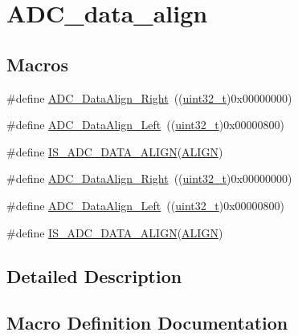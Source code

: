 \hypertarget{group___a_d_c__data__align}{}\section{A\+D\+C\+\_\+data\+\_\+align}
\label{group___a_d_c__data__align}
\subsection*{Macros}
\begin{DoxyCompactItemize}
\item 
\#define \hyperlink{group___a_d_c__data__align_ga80b5d2f2b6b058bc498f58e0a92ad035}{A\+D\+C\+\_\+\+Data\+Align\+\_\+\+Right}~((\hyperlink{_p_e___types_8h_a33594304e786b158f3fb30289278f5af}{uint32\+\_\+t})0x00000000)
\item 
\#define \hyperlink{group___a_d_c__data__align_ga87c2b7021bc288174d5d6175dc267251}{A\+D\+C\+\_\+\+Data\+Align\+\_\+\+Left}~((\hyperlink{_p_e___types_8h_a33594304e786b158f3fb30289278f5af}{uint32\+\_\+t})0x00000800)
\item 
\#define \hyperlink{group___a_d_c__data__align_ga2903b620e3c61dc47ed8c0fbf4197801}{I\+S\+\_\+\+A\+D\+C\+\_\+\+D\+A\+T\+A\+\_\+\+A\+L\+I\+GN}(\hyperlink{usb__devapi_8h_ae4ff5a07c6ff43ed11a3887ef7d524f2}{A\+L\+I\+GN})
\item 
\#define \hyperlink{group___a_d_c__data__align_ga80b5d2f2b6b058bc498f58e0a92ad035}{A\+D\+C\+\_\+\+Data\+Align\+\_\+\+Right}~((\hyperlink{_p_e___types_8h_a33594304e786b158f3fb30289278f5af}{uint32\+\_\+t})0x00000000)
\item 
\#define \hyperlink{group___a_d_c__data__align_ga87c2b7021bc288174d5d6175dc267251}{A\+D\+C\+\_\+\+Data\+Align\+\_\+\+Left}~((\hyperlink{_p_e___types_8h_a33594304e786b158f3fb30289278f5af}{uint32\+\_\+t})0x00000800)
\item 
\#define \hyperlink{group___a_d_c__data__align_ga2903b620e3c61dc47ed8c0fbf4197801}{I\+S\+\_\+\+A\+D\+C\+\_\+\+D\+A\+T\+A\+\_\+\+A\+L\+I\+GN}(\hyperlink{usb__devapi_8h_ae4ff5a07c6ff43ed11a3887ef7d524f2}{A\+L\+I\+GN})
\end{DoxyCompactItemize}


\subsection{Detailed Description}


\subsection{Macro Definition Documentation}
